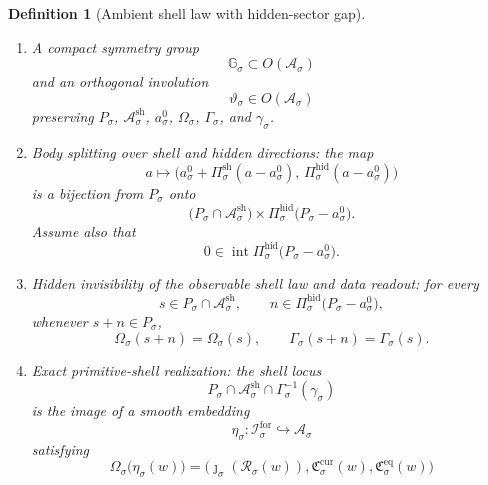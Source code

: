 \documentclass[11pt]{article}
\newcommand{\ForSpace}[1]{\mathcal I_{#1}^{\mathrm{for}}}
\newcommand{\Reduction}[1]{\mathcal R_{#1}}
\newcommand{\CurrentCarrier}[1]{\mathfrak C_{#1}^{\mathrm{cur}}}
\newcommand{\EqCarrier}[1]{\mathfrak C_{#1}^{\mathrm{eq}}}
\newcommand{\AmbientSpace}[1]{\mathcal A_{#1}}
\newcommand{\AmbientBody}[1]{P_{#1}}
\newcommand{\AmbientRead}[1]{\Omega_{#1}}
\newcommand{\AmbientShellLaw}[1]{\Gamma_{#1}}
\newcommand{\AmbientValue}[1]{\gamma_{#1}}
\newcommand{\AmbientSym}[1]{\mathbb G_{#1}}
\newcommand{\AmbientTime}[1]{\vartheta_{#1}}
\newcommand{\ShellAffine}[1]{\mathcal A_{#1}^{\mathrm{sh}}}
\newcommand{\ShellProj}[1]{\Pi_{#1}^{\mathrm{sh}}}
\newcommand{\HiddenProj}[1]{\Pi_{#1}^{\mathrm{hid}}}
\newcommand{\AmbientEmbed}[1]{\eta_{#1}}
\newcommand{\AmbientRef}[1]{a_{#1}^{0}}
\newcommand{\AmbientTarget}[1]{E_{#1}^{\mathrm{amb}}}
\newtheorem{definition}{Definition}
\begin{document}
\begin{definition}[Ambient shell law with hidden-sector gap]
\begin{enumerate}
\[    \]
    and a distinguished shell value
    \[
    \AmbientValue{\sigma}\in \AmbientTarget{\sigma}.
    \]
    \item A compact symmetry group
    \[
    \AmbientSym{\sigma}\subset O(\AmbientSpace{\sigma})
    \]
    and an orthogonal involution
    \[
    \AmbientTime{\sigma}\in O(\AmbientSpace{\sigma})
    \]
    preserving \(\AmbientBody{\sigma}\), \(\ShellAffine{\sigma}\), \(\AmbientRef{\sigma}\), \(\AmbientRead{\sigma}\), \(\AmbientShellLaw{\sigma}\), and \(\AmbientValue{\sigma}\).
    \item Body splitting over shell and hidden directions: the map
    \begin{equation}
    a\longmapsto
    \bigl(
    \AmbientRef{\sigma}+\ShellProj{\sigma}(a-\AmbientRef{\sigma}),
    \,
    \HiddenProj{\sigma}(a-\AmbientRef{\sigma})
    \bigr)
    \label{eq:splitmap}
    \end{equation}
    is a bijection from \(\AmbientBody{\sigma}\) onto
    \[
    \bigl(\AmbientBody{\sigma}\cap \ShellAffine{\sigma}\bigr)
    \times
    \HiddenProj{\sigma}\bigl(\AmbientBody{\sigma}-\AmbientRef{\sigma}\bigr).
    \]
    Assume also that
    \[
    0\in
    \operatorname{int}
    \HiddenProj{\sigma}\bigl(\AmbientBody{\sigma}-\AmbientRef{\sigma}\bigr).
    \]
    \item Hidden invisibility of the observable shell law and data readout: for every
    \[
    s\in \AmbientBody{\sigma}\cap \ShellAffine{\sigma},
    \qquad
    n\in \HiddenProj{\sigma}\bigl(\AmbientBody{\sigma}-\AmbientRef{\sigma}\bigr),
    \]
    whenever \(s+n\in\AmbientBody{\sigma}\),
    \begin{equation}
    \AmbientRead{\sigma}(s+n)=\AmbientRead{\sigma}(s),
    \qquad
    \AmbientShellLaw{\sigma}(s+n)=\AmbientShellLaw{\sigma}(s).
    \label{eq:hiddeninvisible}
    \end{equation}
    \item Exact primitive-shell realization: the shell locus
    \[
    \AmbientBody{\sigma}\cap
    \ShellAffine{\sigma}\cap
    \AmbientShellLaw{\sigma}^{-1}(\AmbientValue{\sigma})
    \]
    is the image of a smooth embedding
    \[
    \AmbientEmbed{\sigma}:\ForSpace{\sigma}\hookrightarrow \AmbientSpace{\sigma}
    \]
    satisfying
    \begin{equation}
    \AmbientRead{\sigma}\bigl(\AmbientEmbed{\sigma}(w)\bigr)
    =
    \bigl(
    \jmath_{\sigma}(\Reduction{\sigma}(w)),
    \CurrentCarrier{\sigma}(w),
    \EqCarrier{\sigma}(w)
    \bigr)
    \label{eq:ambientcompat}
    \end{equation}

\end{enumerate}
\end{definition}
\end{document}
